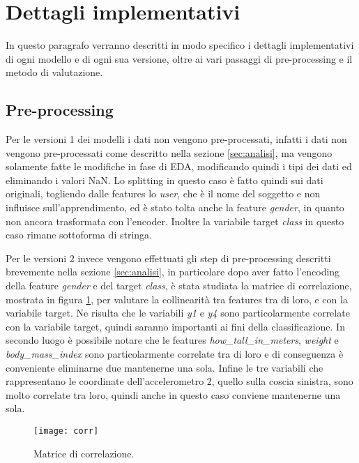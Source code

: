 \section{Dettagli implementativi}\label{sec:implementazione}
In questo paragrafo verranno descritti in modo specifico i dettagli implementativi di ogni modello e di ogni sua versione, oltre ai vari passaggi di pre-processing e il metodo di valutazione.

\subsection{Pre-processing}
Per le versioni 1 dei modelli i dati non vengono pre-processati, infatti i dati non vengono pre-processati come descritto nella sezione \ref{sec:analisi}, ma vengono solamente fatte le modifiche in fase di EDA, modificando quindi i tipi dei dati ed eliminando i valori NaN. Lo splitting in questo caso è fatto quindi sui dati originali, togliendo dalle features lo \textit{user}, che è il nome del soggetto e non influisce sull'apprendimento, ed è stato tolta anche la feature \textit{gender}, in quanto non ancora trasformata con l'encoder. Inoltre la variabile target \textit{class} in questo caso rimane sottoforma di stringa.

Per le versioni 2 invece vengono effettuati gli step di pre-processing descritti brevemente nella sezione \ref{sec:analisi}, in particolare dopo aver fatto l'encoding della feature \textit{gender} e del target \textit{class}, è stata studiata la matrice di correlazione, mostrata in figura \ref{fig:corr}, per valutare la collinearità tra features tra di loro, e con la variabile target. Ne risulta che le variabili \textit{y1} e \textit{y4} sono particolarmente correlate con la variabile target, quindi saranno importanti ai fini della classificazione. In secondo luogo è possibile notare che le features \textit{how\_tall\_in\_meters}, \textit{weight} e \textit{body\_mass\_index} sono particolarmente correlate tra di loro e di conseguenza è conveniente eliminarne due mantenerne una sola. Infine le tre variabili che rappresentano le coordinate dell'accelerometro 2, quello sulla coscia sinistra, sono molto correlate tra loro, quindi anche in questo caso conviene mantenerne una sola.

\begin{figure}[ht]
    \centering\texttt{[image: corr]}
    \caption{Matrice di correlazione.}
    \label{fig:corr}
\end{figure}

